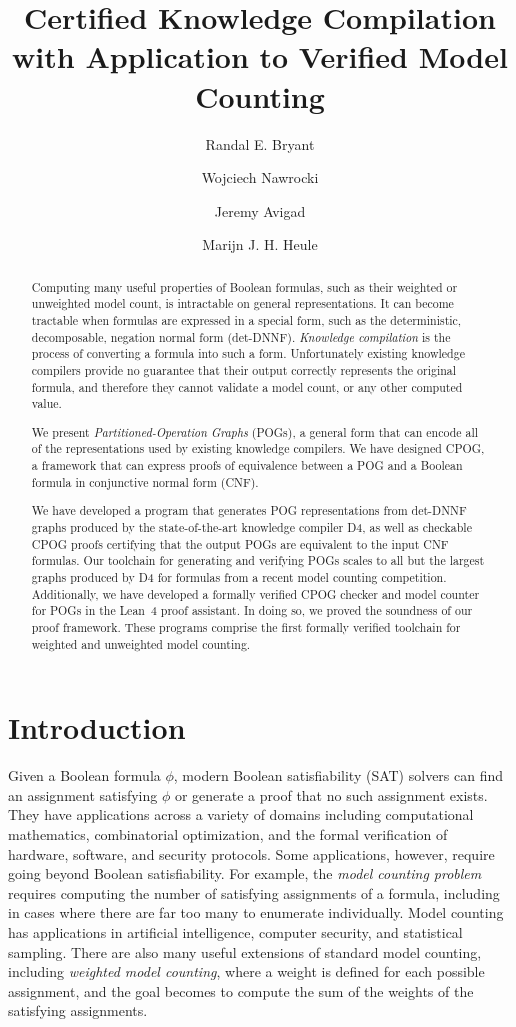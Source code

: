 \documentclass[letterpaper,USenglish,cleveref, autoref, thm-restate]{lipics-v2021}
\title{Certified Knowledge Compilation \\ with Application to Verified Model Counting}
\author{Randal E. Bryant}{Computer Science Department, Carnegie Mellon University, Pittsburgh, PA 15213 USA}{Randy.Bryant@cs.cmu.edu}{https://orcid.org/0000-0001-5024-6613}{Supported by NSF grant CCF-2108521}
\author{Wojciech Nawrocki}{Department of Philosophy, Carnegie Mellon University}{wjnawrocki@cmu.edu}{https://orcid.org/0000-0002-8839-0618}{Hoskinson Center for Formal Mathematics}
\author{Jeremy Avigad}{Department of Philosophy, Carnegie Mellon University}{avigad@cmu.edu}{https://orcid.org/0000-0003-1275-315X}{Hoskinson Center for Formal Mathematics}
\author{Marijn J. H. Heule}{Computer Science Department, Carnegie Mellon University}{marijn@cmu.edu}{https://orcid.org/0000-0002-5587-8801}{Supported by NSF grant CCF-2108521}
\newcommand{\progname}[1]{\textsc{#1}}
\newcommand{\dfour}{\progname{D4}}
\newcommand{\lean}{Lean~4}
\begin{document}
\maketitle

\begin{abstract}

Computing many useful properties of Boolean formulas, such as their weighted or unweighted model count,
is intractable on general representations. It can become tractable when formulas are expressed in a
special form, such as the deterministic,
decomposable, negation normal form (det-DNNF)\@.
\emph{Knowledge compilation} is the process of converting a formula
into such a form. Unfortunately existing knowledge compilers provide no guarantee that their output correctly
represents the original formula, and therefore they cannot validate a model count, or any other computed value.

We present \emph{Partitioned-Operation Graphs} (POGs), a general form that can
encode all
of the representations used by existing knowledge compilers.
We have designed  CPOG, a framework that can express proofs of equivalence between a
POG  and a Boolean formula in conjunctive normal form (CNF).

We have developed a program that generates POG representations from det-DNNF
graphs 
produced by the state-of-the-art knowledge compiler
\dfour{}, as well as checkable CPOG proofs certifying that the output POGs
are equivalent to the input CNF formulas.  Our toolchain
for generating and verifying POGs scales to all but the largest
graphs produced by \dfour{} for formulas from a recent model counting
competition. Additionally, we have developed a formally verified CPOG
checker and model counter for POGs in the \lean{} proof assistant.
In doing so, we proved the soundness of our proof framework. These programs
comprise the first formally verified toolchain for weighted and unweighted
model counting.
\end{abstract}

\section{Introduction}

Given a Boolean formula $\phi$, modern Boolean satisfiability (SAT) solvers can
find an assignment satisfying $\phi$ or generate a proof that no
such assignment exists.  They have applications across a variety of
domains including computational mathematics, combinatorial
optimization, and the formal verification of hardware, software, and
security protocols.  Some applications, however, require going
beyond Boolean satisfiability.  For example, the \emph{model
  counting problem} requires computing the number of satisfying
assignments of a formula, including in cases where there are far too many
to enumerate individually.  Model counting has
applications in artificial intelligence, computer security, and
statistical sampling.  There are also many useful extensions of standard model counting,
including {\em
  weighted model counting}, where a weight is defined for
each possible assignment, and the goal becomes to compute the sum of the weights
of the satisfying assignments.
\end{document}
